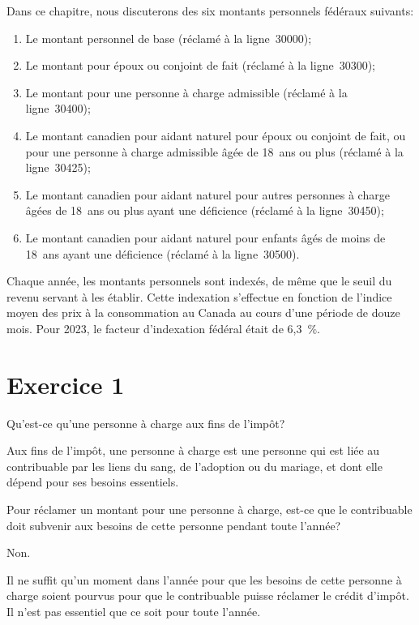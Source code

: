 Dans ce chapitre, nous discuterons des six montants personnels fédéraux suivants:

\begin{enumerate}
	\item Le montant personnel de base (réclamé à la ligne~30000);
	\item Le montant pour époux ou conjoint de fait (réclamé à la ligne~30300);
	\item Le montant pour une personne à charge admissible (réclamé à la ligne~30400);
	\item Le montant canadien pour aidant naturel pour époux ou conjoint de fait, ou pour une personne à charge admissible âgée de 18~ans ou plus (réclamé à la ligne~30425);
	\item Le montant canadien pour aidant naturel pour autres personnes à charge âgées de 18~ans ou plus ayant une déficience (réclamé à la ligne~30450);
	\item Le montant canadien pour aidant naturel pour enfants âgés de moins de 18~ans ayant une déficience (réclamé à la ligne~30500).
\end{enumerate}

Chaque année, les montants personnels sont indexés, de même que le seuil du revenu servant à les établir. Cette indexation s'effectue en fonction de l'indice moyen des prix à la consommation au Canada au cours d'une période de douze mois. Pour 2023, le facteur d'indexation fédéral était de 6,3~\%.



\section{Exercice 1}
\setcounter{question}{0}
\begin{question}
	Qu'est-ce qu'une personne à charge aux fins de l'impôt?
\end{question}
Aux fins de l'impôt, une \og personne à charge \fg{} est une personne qui est liée au contribuable par les liens du sang, de l'adoption ou du mariage, et dont elle dépend pour ses besoins essentiels.

\begin{question}
	Pour réclamer un montant pour une personne à charge, est-ce que le contribuable doit subvenir aux besoins de cette personne pendant toute l'année?
\end{question}
Non.

Il ne suffit qu'un moment dans l'année pour que les besoins de cette personne à charge soient pourvus pour que le contribuable puisse réclamer le crédit d'impôt. Il n'est pas essentiel que ce soit pour toute l'année.

